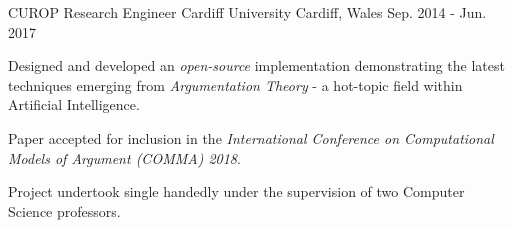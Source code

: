 \begin{cventries}
  \cventry
    {CUROP Research Engineer} %
    {Cardiff University} %
    {Cardiff, Wales} %
    {Sep. 2014 - Jun. 2017} %
    {
      \begin{cvitems} %
        \item Designed and developed an \textit{open-source} implementation demonstrating the latest techniques emerging from \textit{Argumentation Theory} - a hot-topic field within Artificial Intelligence.         
        \item Paper accepted for inclusion in the \textit{International Conference on Computational Models of Argument (COMMA) 2018}.
        \item Project undertook single handedly under the supervision of two Computer Science professors.
      \end{cvitems}
    }
    {}


\end{cventries}

